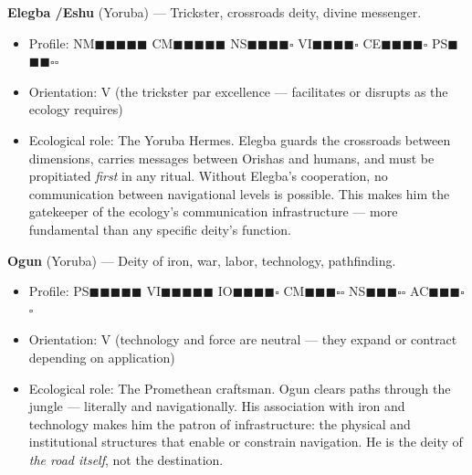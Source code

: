 \textbf{Elegba /\allowbreak  Eshu} (Yoruba) — Trickster, crossroads deity, divine messenger.

\begin{itemize}[nosep,leftmargin=*]
  \item Profile: NM$\blacksquare$$\blacksquare$$\blacksquare$$\blacksquare$$\blacksquare$ CM$\blacksquare$$\blacksquare$$\blacksquare$$\blacksquare$$\blacksquare$ NS$\blacksquare$$\blacksquare$$\blacksquare$$\blacksquare$$\square$ VI$\blacksquare$$\blacksquare$$\blacksquare$$\blacksquare$$\square$ CE$\blacksquare$$\blacksquare$$\blacksquare$$\blacksquare$$\square$ PS$\blacksquare$$\blacksquare$$\blacksquare$$\square$$\square$
  \item Orientation: V (the trickster par excellence — facilitates or disrupts as the ecology requires)
  \item Ecological role: The Yoruba Hermes. Elegba guards the crossroads between dimensions, carries messages between Orishas and humans, and must be propitiated \textit{first} in any ritual. Without Elegba's cooperation, no communication between navigational levels is possible. This makes him the gatekeeper of the ecology's communication infrastructure — more fundamental than any specific deity's function.
\end{itemize}


\textbf{Ogun} (Yoruba) — Deity of iron, war, labor, technology, pathfinding.

\begin{itemize}[nosep,leftmargin=*]
  \item Profile: PS$\blacksquare$$\blacksquare$$\blacksquare$$\blacksquare$$\blacksquare$ VI$\blacksquare$$\blacksquare$$\blacksquare$$\blacksquare$$\blacksquare$ IO$\blacksquare$$\blacksquare$$\blacksquare$$\blacksquare$$\square$ CM$\blacksquare$$\blacksquare$$\blacksquare$$\square$$\square$ NS$\blacksquare$$\blacksquare$$\blacksquare$$\square$$\square$ AC$\blacksquare$$\blacksquare$$\blacksquare$$\square$$\square$
  \item Orientation: V (technology and force are neutral — they expand or contract depending on application)
  \item Ecological role: The Promethean craftsman. Ogun clears paths through the jungle — literally and navigationally. His association with iron and technology makes him the patron of infrastructure: the physical and institutional structures that enable or constrain navigation. He is the deity of \textit{the road itself}, not the destination.
\end{itemize}


